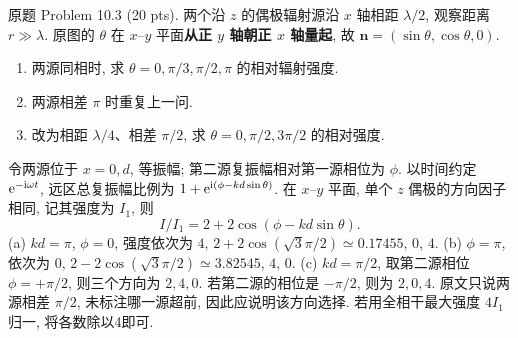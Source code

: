 \begin{exercise}\label{ps:10.3}
原题 Problem 10.3 (20 pts). 两个沿 $z$ 的偶极辐射源沿 $x$ 轴相距 $\lambda/2$, 观察距离 $r\gg\lambda$. 原图的 $\theta$ 在 $x$--$y$ 平面\textbf{从正 $y$ 轴朝正 $x$ 轴量起}, 故 $\hat{\mathbf n}=(\sin\theta,\cos\theta,0)$.
\begin{enumerate}[label=\alph*.]
\item 两源同相时, 求 $\theta=0,\pi/3,\pi/2,\pi$ 的相对辐射强度.
\item 两源相差 $\pi$ 时重复上一问.
\item 改为相距 $\lambda/4$、相差 $\pi/2$, 求 $\theta=0,\pi/2,3\pi/2$ 的相对强度.
\end{enumerate}
\end{exercise}
\begin{solution}
令两源位于 $x=0,d$, 等振幅; 第二源复振幅相对第一源相位为 $\phi$. 以时间约定 $\mathrm e^{-\mathrm i\omega t}$, 远区总复振幅比例为 $1+\mathrm e^{\mathrm i(\phi-kd\sin\theta)}$. 在 $x$--$y$ 平面, 单个 $z$ 偶极的方向因子相同, 记其强度为 $I_1$, 则
\[
I/I_1=2+2\cos(\phi-kd\sin\theta).
\]
(a) $kd=\pi$, $\phi=0$, 强度依次为
$4$, $2+2\cos(\sqrt3\pi/2)\simeq0.17455$, $0$, $4$.
(b) $\phi=\pi$, 依次为 $0$, $2-2\cos(\sqrt3\pi/2)\simeq3.82545$, $4$, $0$.
(c) $kd=\pi/2$, 取第二源相位 $\phi=+\pi/2$, 则三个方向为 $2,4,0$. 若第二源的相位是 $-\pi/2$, 则为 $2,0,4$. 原文只说两源相差 $\pi/2$, 未标注哪一源超前, 因此应说明该方向选择. 若用全相干最大强度 $4I_1$ 归一, 将各数除以4即可.
\end{solution}

